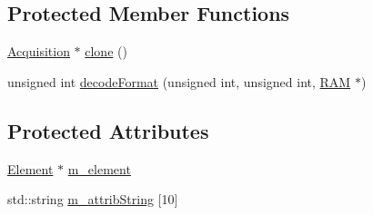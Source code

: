 \subsection*{Protected Member Functions}
\begin{DoxyCompactItemize}
\item 
\hyperlink{classAcquisition_1_1Acquisition}{Acquisition} $\ast$ \hyperlink{classAcquisition_a4b1b690ef27f20b3e1ad9383f2f57628}{clone} ()
\item 
unsigned int \hyperlink{classAcquisition_a76fe7c020f7097e5d479867ba783ba31}{decodeFormat} (unsigned int, unsigned int, \hyperlink{classRAM}{RAM} $\ast$)
\end{DoxyCompactItemize}
\subsection*{Protected Attributes}
\begin{DoxyCompactItemize}
\item 
\hyperlink{classElement}{Element} $\ast$ \hyperlink{classProcessus_aa9d24d53c3e52f36786cabb5d8e296e7}{m\_\-element}
\item 
std::string \hyperlink{classAttrib_a3414521d7a82476e874b25a5407b5e63}{m\_\-attribString} \mbox{[}10\mbox{]}
\end{DoxyCompactItemize}

